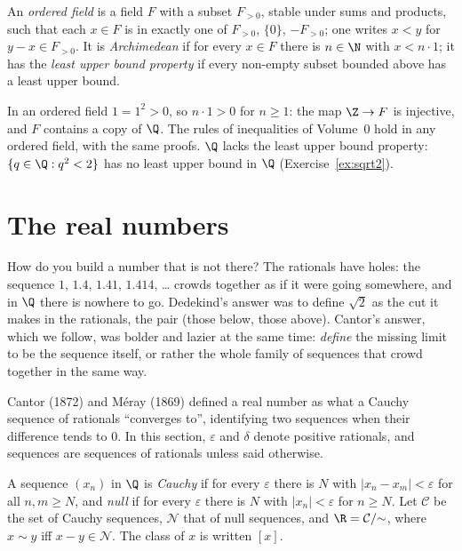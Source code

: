 \begin{definition}
An \emph{ordered field} is a field $F$ with a subset $F_{>0}$, stable under sums and products, such that each $x\in F$ is in
exactly one of $F_{>0}$, $\{0\}$, $-F_{>0}$; one writes $x<y$ for $y-x\in F_{>0}$. It is \emph{Archimedean} if for every $x\in F$ there is
$n\in\N$ with $x<n\cdot1$; it has the \emph{least upper bound property} if every non-empty subset bounded above has a least upper
bound.
\end{definition}

In an ordered field $1=1^2>0$, so $n\cdot1>0$ for $n\ge1$: the map $\Z\to F$ is injective, and $F$ contains a copy of $\Q$. The rules
of inequalities of Volume~0 hold in any ordered field, with the same proofs. $\Q$ lacks the least upper bound property:
$\{q\in\Q:q^2<2\}$ has no least upper bound in $\Q$ (Exercise~\ref{ex:sqrt2}).

\section{The real numbers}\label{sec:reals}

How do you build a number that is not there? The rationals have holes: the sequence $1$, $1.4$, $1.41$, $1.414$, \ldots{}
crowds together as if it were going somewhere, and in $\Q$ there is nowhere to go. Dedekind's answer was to define
$\sqrt2$ as the cut it makes in the rationals, the pair (those below, those above). Cantor's answer, which we follow, was
bolder and lazier at the same time: \emph{define} the missing limit to be the sequence itself, or rather the whole
family of sequences that crowd together in the same way.

Cantor (1872) and M\'eray (1869) defined a real number as what a Cauchy sequence of rationals ``converges to'',
identifying two sequences when their difference tends to $0$. In this section, $\varepsilon$ and $\delta$ denote positive
rationals, and sequences are sequences of rationals unless said otherwise.

\begin{definition}
A sequence $(x_n)$ in $\Q$ is \emph{Cauchy} if for every $\varepsilon$ there is $N$ with $|x_n-x_m|<\varepsilon$ for all $n,m\ge N$, and \emph{null}
if for every $\varepsilon$ there is $N$ with $|x_n|<\varepsilon$ for $n\ge N$. Let $\mathcal C$ be the set of Cauchy sequences, $\mathcal N$ that of null
sequences, and $\R=\mathcal C/{\sim}$, where $x\sim y$ iff $x-y\in\mathcal N$. The class of $x$ is written $[x]$.
\end{definition}

